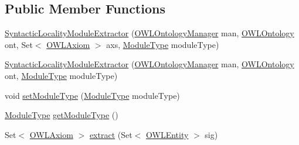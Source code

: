 \subsection*{Public Member Functions}
\begin{DoxyCompactItemize}
\item 
\hyperlink{classuk_1_1ac_1_1manchester_1_1cs_1_1owlapi_1_1modularity_1_1_syntactic_locality_module_extractor_a2a2f4c07c17f6f591be1abd6b82aebbd}{Syntactic\-Locality\-Module\-Extractor} (\hyperlink{interfaceorg_1_1semanticweb_1_1owlapi_1_1model_1_1_o_w_l_ontology_manager}{O\-W\-L\-Ontology\-Manager} man, \hyperlink{interfaceorg_1_1semanticweb_1_1owlapi_1_1model_1_1_o_w_l_ontology}{O\-W\-L\-Ontology} ont, Set$<$ \hyperlink{interfaceorg_1_1semanticweb_1_1owlapi_1_1model_1_1_o_w_l_axiom}{O\-W\-L\-Axiom} $>$ axs, \hyperlink{enumuk_1_1ac_1_1manchester_1_1cs_1_1owlapi_1_1modularity_1_1_module_type}{Module\-Type} module\-Type)
\item 
\hyperlink{classuk_1_1ac_1_1manchester_1_1cs_1_1owlapi_1_1modularity_1_1_syntactic_locality_module_extractor_a46297063753edef0f277c75fcbbf859f}{Syntactic\-Locality\-Module\-Extractor} (\hyperlink{interfaceorg_1_1semanticweb_1_1owlapi_1_1model_1_1_o_w_l_ontology_manager}{O\-W\-L\-Ontology\-Manager} man, \hyperlink{interfaceorg_1_1semanticweb_1_1owlapi_1_1model_1_1_o_w_l_ontology}{O\-W\-L\-Ontology} ont, \hyperlink{enumuk_1_1ac_1_1manchester_1_1cs_1_1owlapi_1_1modularity_1_1_module_type}{Module\-Type} module\-Type)
\item 
void \hyperlink{classuk_1_1ac_1_1manchester_1_1cs_1_1owlapi_1_1modularity_1_1_syntactic_locality_module_extractor_afc04fd1282ffdb1bbb7fe7951cb21248}{set\-Module\-Type} (\hyperlink{enumuk_1_1ac_1_1manchester_1_1cs_1_1owlapi_1_1modularity_1_1_module_type}{Module\-Type} module\-Type)
\item 
\hyperlink{enumuk_1_1ac_1_1manchester_1_1cs_1_1owlapi_1_1modularity_1_1_module_type}{Module\-Type} \hyperlink{classuk_1_1ac_1_1manchester_1_1cs_1_1owlapi_1_1modularity_1_1_syntactic_locality_module_extractor_a5c8f6fe7409fae89d5bc65f5175bb98f}{get\-Module\-Type} ()
\item 
Set$<$ \hyperlink{interfaceorg_1_1semanticweb_1_1owlapi_1_1model_1_1_o_w_l_axiom}{O\-W\-L\-Axiom} $>$ \hyperlink{classuk_1_1ac_1_1manchester_1_1cs_1_1owlapi_1_1modularity_1_1_syntactic_locality_module_extractor_abc853f485abc1c1c5221eea57bfbc9c0}{extract} (Set$<$ \hyperlink{interfaceorg_1_1semanticweb_1_1owlapi_1_1model_1_1_o_w_l_entity}{O\-W\-L\-Entity} $>$ sig)
\item 

\end{DoxyCompactItemize}
